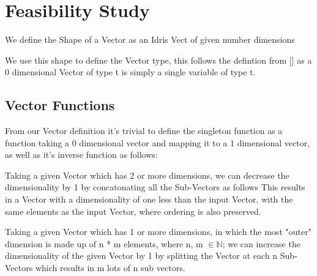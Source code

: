 \section{Feasibility Study}


We define the Shape of a Vector as
an Idris Vect of given number dimensions


We use this shape to define the Vector type,
this follows the defintion from [] as a 0 dimensional
Vector of type t is simply a single variable of type t.




\subsection{Vector Functions}


From our Vector definition it's trivial to define the singleton function
as a function taking a 0 dimensional vector and mapping it to a 1 dimensional
vector, as well as it's inverse function as follows:



Taking a given Vector which has 2 or more dimensions, we can decrease 
the dimensionality by 1 by concatonating all the Sub-Vectors as follows
This results in a Vector with a dimensionality of one less than the input Vector,
with the same elements as the input Vector, where ordering is
also preserved. 


Taking a given Vector which has 1 or more dimensions, in which the most "outer" dimension is
made up of n * m elements, where n, m $\in \mathbb{N}$; we can increase the dimensionality of
the given Vector by 1 by splitting the Vector at each n Sub-Vectors which results in m lots of
n sub vectors. 
